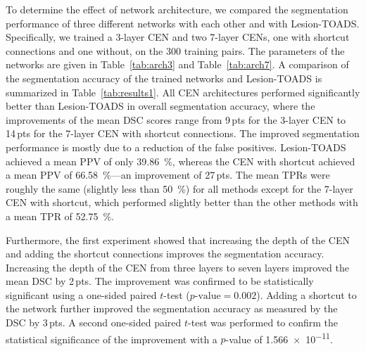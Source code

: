 To determine the effect of network architecture, we compared the segmentation
performance of three different networks with each other and with Lesion-TOADS.
Specifically, we trained a 3-layer CEN and two 7-layer CENs, one with shortcut
connections and one without, on the 300 training pairs. The parameters of the
networks are given in Table~\ref{tab:arch3} and Table~\ref{tab:arch7}.
A comparison of the segmentation accuracy of the trained networks and
Lesion-TOADS is summarized in Table~\ref{tab:results1}. All CEN architectures
performed significantly better than Lesion-TOADS in overall segmentation
accuracy, where the improvements of the mean DSC scores range from 9\,pts for
the 3-layer CEN to 14\,pts for the 7-layer CEN with shortcut connections. The
improved segmentation performance is mostly due to a reduction of the false
positives. Lesion-TOADS achieved a mean PPV of only \SI{39.86}{\percent},
whereas the CEN with shortcut achieved a mean PPV of \SI{66.58}{\percent}---an
improvement of 27\,pts. The mean TPRs were roughly the same (slightly less than
\SI{50}{\percent}) for all methods except for the 7-layer CEN with shortcut,
which performed slightly better than the other methods with a mean TPR of
\SI{52.75}{\percent}.

Furthermore, the first experiment showed that increasing the depth of the CEN
and adding the shortcut connections improves the segmentation accuracy.
Increasing the depth of the CEN from three layers to seven layers improved the
mean DSC by 2\,pts. The improvement was confirmed to be statistically
significant using a one-sided paired $t$-test ($p\text{-value}=\num{0.002}$).
Adding a shortcut to the network further improved the segmentation
accuracy as measured by the DSC by 3\,pts. A second one-sided paired $t$-test
was performed to confirm the statistical significance of the improvement with a
$p$-value of \num{1.566e-11}.


